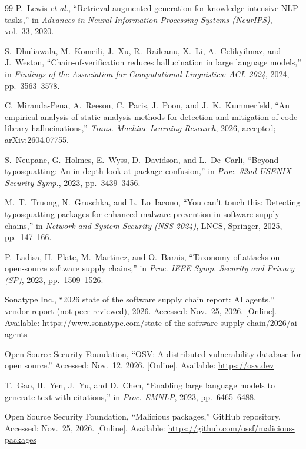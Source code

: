 \documentclass[conference]{IEEEtran}
\begin{document}
\begin{thebibliography}{99}
P.~Lewis \emph{et al.},
``Retrieval-augmented generation for knowledge-intensive NLP tasks,''
in \emph{Advances in Neural Information Processing Systems (NeurIPS)}, vol.~33, 2020.

S.~Dhuliawala, M.~Komeili, J.~Xu, R.~Raileanu, X.~Li, A.~Celikyilmaz, and J.~Weston,
``Chain-of-verification reduces hallucination in large language models,''
in \emph{Findings of the Association for Computational Linguistics: ACL 2024}, 2024, pp.~3563--3578.

C.~Miranda-Pena, A.~Reeson, C.~Paris, J.~Poon, and J.~K.~Kummerfeld,
``An empirical analysis of static analysis methods for detection and mitigation of code library
hallucinations,'' \emph{Trans. Machine Learning Research}, 2026, accepted; arXiv:2604.07755.

S.~Neupane, G.~Holmes, E.~Wyss, D.~Davidson, and L.~De~Carli,
``Beyond typosquatting: An in-depth look at package confusion,''
in \emph{Proc. 32nd USENIX Security Symp.}, 2023, pp.~3439--3456.

M.~T.~Truong, N.~Gruschka, and L.~Lo~Iacono,
``You can't touch this: Detecting typosquatting packages for enhanced malware prevention in software supply
chains,'' in \emph{Network and System Security (NSS 2024)}, LNCS, Springer, 2025, pp.~147--166.

P.~Ladisa, H.~Plate, M.~Martinez, and O.~Barais,
``Taxonomy of attacks on open-source software supply chains,''
in \emph{Proc. IEEE Symp. Security and Privacy (SP)}, 2023, pp.~1509--1526.

Sonatype Inc., ``2026 state of the software supply chain report: AI agents,'' vendor report (not peer
reviewed), 2026. Accessed: Nov.~25, 2026. [Online]. Available: \url{https://www.sonatype.com/state-of-the-software-supply-chain/2026/ai-agents}

Open Source Security Foundation, ``OSV: A distributed vulnerability database for open source.'' Accessed: Nov.~12, 2026. [Online].
Available: \url{https://osv.dev}

T.~Gao, H.~Yen, J.~Yu, and D.~Chen,
``Enabling large language models to generate text with citations,''
in \emph{Proc. EMNLP}, 2023, pp.~6465--6488.

Open Source Security Foundation, ``Malicious packages,'' GitHub repository. Accessed: Nov.~25, 2026. [Online].
Available: \url{https://github.com/ossf/malicious-packages}


\end{thebibliography}
\end{document}
